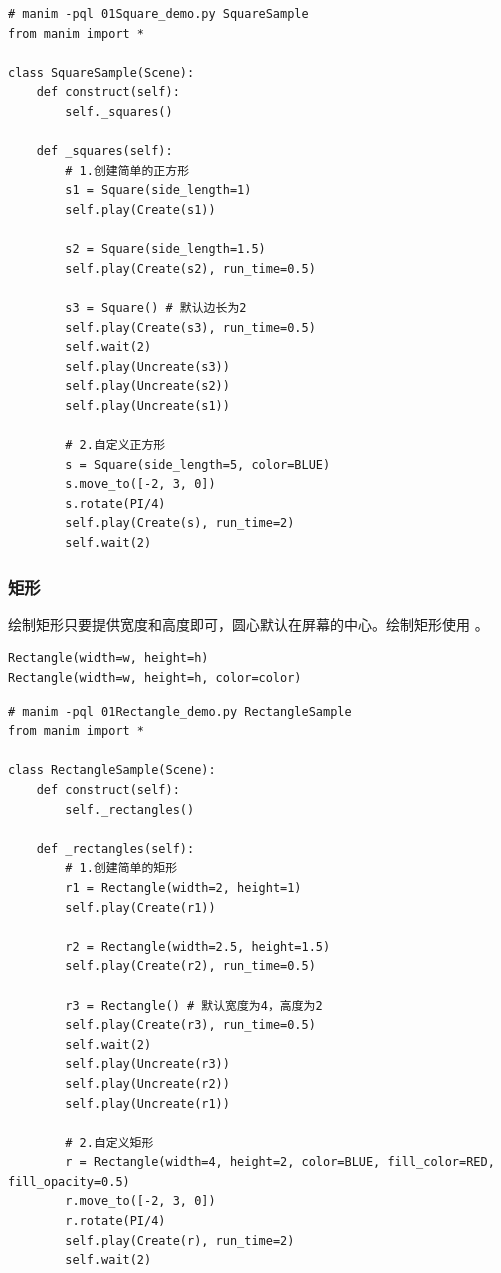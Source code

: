 \begin{lstlisting}[style=pythonstyle]
# manim -pql 01Square_demo.py SquareSample
from manim import *

class SquareSample(Scene):
    def construct(self):
        self._squares()

    def _squares(self):
        # 1.创建简单的正方形
        s1 = Square(side_length=1)
        self.play(Create(s1))
        
        s2 = Square(side_length=1.5)
        self.play(Create(s2), run_time=0.5)

        s3 = Square() # 默认边长为2
        self.play(Create(s3), run_time=0.5)
        self.wait(2)
        self.play(Uncreate(s3))
        self.play(Uncreate(s2))
        self.play(Uncreate(s1))

        # 2.自定义正方形
        s = Square(side_length=5, color=BLUE)
        s.move_to([-2, 3, 0])
        s.rotate(PI/4)
        self.play(Create(s), run_time=2)
        self.wait(2)
\end{lstlisting}

\subsubsection{矩形}
绘制矩形只要提供宽度和高度即可，圆心默认在屏幕的中心。绘制矩形使用 。

\begin{lstlisting}[style=demostyle,numbers=none]
Rectangle(width=w, height=h)
Rectangle(width=w, height=h, color=color)
\end{lstlisting}

\begin{lstlisting}[style=pythonstyle]
# manim -pql 01Rectangle_demo.py RectangleSample
from manim import *

class RectangleSample(Scene):
    def construct(self):
        self._rectangles()

    def _rectangles(self):
        # 1.创建简单的矩形
        r1 = Rectangle(width=2, height=1)
        self.play(Create(r1))
        
        r2 = Rectangle(width=2.5, height=1.5)
        self.play(Create(r2), run_time=0.5)

        r3 = Rectangle() # 默认宽度为4，高度为2
        self.play(Create(r3), run_time=0.5)
        self.wait(2)
        self.play(Uncreate(r3))
        self.play(Uncreate(r2))
        self.play(Uncreate(r1))

        # 2.自定义矩形
        r = Rectangle(width=4, height=2, color=BLUE, fill_color=RED, fill_opacity=0.5)
        r.move_to([-2, 3, 0])
        r.rotate(PI/4)
        self.play(Create(r), run_time=2)
        self.wait(2)
\end{lstlisting}



